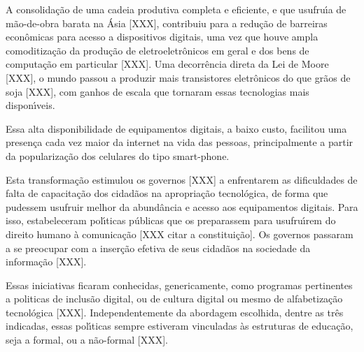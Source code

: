 \documentclass[
12pt,		%
openright,	%
twoside,  %
a4paper,			%
chapter=TITLE,		%
english,			%
french,				%
spanish,			%
brazil				%
]{USPSC-classe/USPSC}
\begin{document}
A consolida\c{c}\~ao de uma cadeia produtiva completa e eficiente, e que usufru\'{\i}a de m\~ao-de-obra barata na \'Asia [XXX], contribuiu para a redu\c{c}\~ao de barreiras econ\^omicas para acesso a dispositivos digitais, uma vez que houve ampla comoditiza\c{c}\~ao da produ\c{c}\~ao de eletroeletr\^onicos em geral e dos bens de computa\c{c}\~ao em particular [XXX]. Uma decorr\^encia direta da Lei de Moore [XXX], o mundo passou a produzir mais transistores eletr\^onicos do que gr\~aos de soja [XXX], com ganhos de escala que tornaram essas tecnologias mais dispon\'{\i}veis.














Essa alta disponibilidade de equipamentos digitais, a baixo custo, facilitou uma presen\c{c}a cada vez maior da internet na vida das pessoas, principalmente a partir da populariza\c{c}\~ao dos celulares do tipo \textquotedbl smart-phone.














Esta transforma\c{c}\~ao estimulou os governos [XXX] a enfrentarem as dificuldades  de falta de  capacita\c{c}\~ao dos cidad\~aos na apropria\c{c}\~ao tecnol\'ogica, de forma que pudessem usufruir melhor da abund\^ancia e acesso aos equipamentos digitais. Para isso, estabeleceram pol\'{\i}ticas p\'ublicas que os preparassem para usufru\'{\i}rem do direito humano \`a comunica\c{c}\~ao [XXX citar a constitui\c{c}\~ao]. Os governos passaram a se preocupar com a inser\c{c}\~ao efetiva de seus cidad\~aos na sociedade da informa\c{c}\~ao [XXX].














Essas iniciativas ficaram conhecidas, genericamente, como programas pertinentes a politicas de \textquotedbl inclus\~ao digital, ou  de \textquotedbl cultura digital ou mesmo de \textquotedbl alfabetiza\c{c}\~ao tecnol\'ogica [XXX]. Independentemente da abordagem escolhida, dentre as tr\^es indicadas, essas pol\'{\i}ticas sempre estiveram vinculadas \`as estruturas de educa\c{c}\~ao, seja a formal, ou a n\~ao-formal [XXX].
\end{document}
